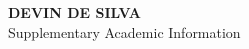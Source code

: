 \documentclass{resume} %
\begin{document}









\newpage

\begin{center}
{\LARGE\bf DEVIN DE SILVA}\\[2pt]
{\large Supplementary Academic Information}
\end{center}
\end{document}
